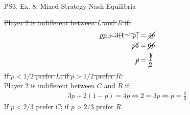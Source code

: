 \begin{frame}{PS3, Ex. 8: Mixed Strategy Nash Equilibria}
\begin{multicols}{2}
    \sout{Player 2 is indifferent between $L$ and $R$ if:}
    \begin{align*}
      \cancel{pp+3(1-p)}&= \cancel{4p } \\
      \cancel{p3}       &= \cancel{6p } \\
      \cancel{p}        &= \cancel{\frac{1}{2} }
    \end{align*}
    \sout{If $p<1/2$ prefer $L$; if $p>1/2$ prefer $R$.}\\\medskip
    Player 2 is indifferent between $C$ and $R$ if:
    \begin{align*}
      3p+2(1-p) = 4p \Leftrightarrow 2 = 3p \Leftrightarrow p = \frac{2}{3}
    \end{align*}
    If $p<2/3$ prefer $C$; if $p>2/3$ prefer $R$.\\\medskip
  \vfill\null
  \end{multicols}
\end{frame}

